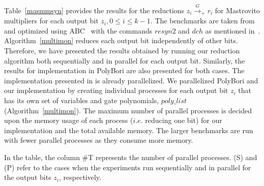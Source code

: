 

\par Table~\ref{masmmsyn} provides the results for the reductions $z_i
\xrightarrow{G}_+ r_i$ for Mastrovito multipliers for each output bit
$z_i, 0\leq i \leq k-1$. The benchmarks are taken
from~\cite{lv:tcad2013} and optimized using ABC~\cite{ABCtool} with
the commands $resyn2$ and $dch$ as mentioned
in~\cite{cunxi:aspdac17}. Algorithm~\ref{multimon} reduces each output
bit independently of other bits. Therefore, we have presented the
results obtained by running our reduction algorithm both 
sequentially and in parallel for each output bit. Similarly, the results for
implementation in PolyBori are also presented for both cases. The
implementation presented in \cite{cunxi:aspdac17} is already
parallelized. We parallelized PolyBori and our implementation by
creating individual processes for  each output bit $z_i$ that has its
own set of variables and gate polynomials, $poly\_list$
(Algorithm~\ref{multimon}). The maximum number of parallel processes
is decided upon the memory usage of each process ($i.e.$ reducing one
bit) for our implementation and the total available memory. The larger
benchmarks are run with fewer parallel processes as they consume more
memory. 
\par In the table, the column \#T represents the number of parallel
processes. (S) and (P) refer to the cases when the experiments run
sequentially and in parallel for the output bits $z_i$, respectively.  


